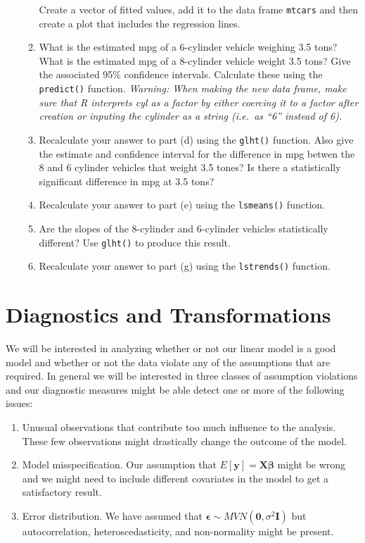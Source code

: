 \documentclass[]{book}
\theoremstyle{definition}
\theoremstyle{definition}
\theoremstyle{remark}
\begin{document}
\begin{enumerate}
\begin{enumerate}
    Create a vector of fitted values, add it to the data frame
    \texttt{mtcars} and then create a plot that includes the regression
    lines.
  \item
    What is the estimated mpg of a 6-cylinder vehicle weighing 3.5 tons?
    What is the estimated mpg of a 8-cylinder vehicle weight 3.5 tons?
    Give the associated 95\% confidence intervals. Calculate these using
    the \texttt{predict()} function. \emph{Warning: When making the new
    data frame, make sure that R interprets cyl as a factor by either
    coercing it to a factor after creation or inputing the cylinder as a
    string (i.e.~as ``6'' instead of 6).}
  \item
    Recalculate your answer to part (d) using the \texttt{glht()}
    function. Also give the estimate and confidence interval for the
    difference in mpg betwen the 8 and 6 cylinder vehicles that weight
    3.5 tones? Is there a statistically significant difference in mpg at
    3.5 tons?
  \item
    Recalculate your answer to part (e) using the \texttt{lsmeans()}
    function.
  \item
    Are the slopes of the 8-cylinder and 6-cylinder vehicles
    statistically different? Use \texttt{glht()} to produce this result.
  \item
    Recalculate your answer to part (g) using the \texttt{lstrends()}
    function.
  \end{enumerate}
\end{enumerate}

\chapter{Diagnostics and
Transformations}\label{diagnostics-and-transformations}

We will be interested in analyzing whether or not our linear model is a
good model and whether or not the data violate any of the assumptions
that are required. In general we will be interested in three classes of
assumption violations and our diagnostic measures might be able detect
one or more of the following issues:

\begin{enumerate}
\def\labelenumi{\arabic{enumi}.}
\item
  Unusual observations that contribute too much influence to the
  analysis. These few observations might drastically change the outcome
  of the model.
\item
  Model misspecification. Our assumption that
  \(E\left[\boldsymbol{y}\right]=\boldsymbol{X}\boldsymbol{\beta}\)
  might be wrong and we might need to include different covariates in
  the model to get a satisfactory result.
\item
  Error distribution. We have assumed that
  \(\boldsymbol{\epsilon}\sim MVN\left(\boldsymbol{0},\sigma^{2}\boldsymbol{I}\right)\)
  but autocorrelation, heteroscedasticity, and non-normality might be
  present.
\end{enumerate}
\end{document}
